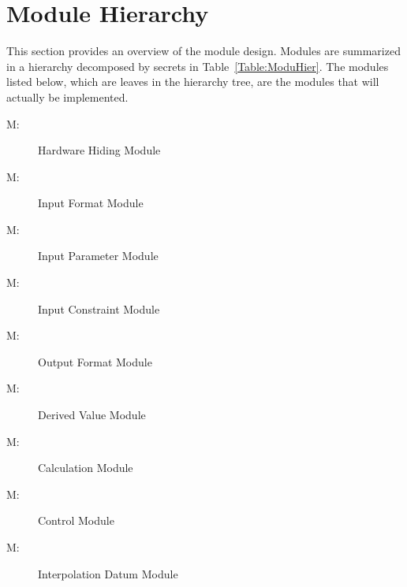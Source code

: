 \documentclass[12pt]{article}
\newcounter{modnum}
\newcommand{\mthemodnum}{M\themodnum}
\begin{document}
\section{Module Hierarchy}
\label{Sec:ModuHier}
This section provides an overview of the module design. Modules are summarized in a hierarchy decomposed by secrets in Table~\ref{Table:ModuHier}. The modules listed below, which are leaves in the hierarchy tree, are the modules that will actually be implemented.
\begin{description}
\item[\mthemodnum\label{M:hwHiding}:]Hardware Hiding Module
\end{description}
\begin{description}
\item[\mthemodnum\label{M:modInputFormat}:]Input Format Module
\end{description}
\begin{description}
\item[\mthemodnum\label{M:modInputParam}:]Input Parameter Module
\end{description}
\begin{description}
\item[\mthemodnum\label{M:modInputConstraint}:]Input Constraint Module
\end{description}
\begin{description}
\item[\mthemodnum\label{M:modoutputfdesc}:]Output Format Module
\end{description}
\begin{description}
\item[\mthemodnum\label{M:modDerivedVal}:]Derived Value Module
\end{description}
\begin{description}
\item[\mthemodnum\label{M:modcalcdesc}:]Calculation Module
\end{description}
\begin{description}
\item[\mthemodnum\label{M:modControl}:]Control Module
\end{description}
\begin{description}
\item[\mthemodnum\label{M:modInterpDatum}:]Interpolation Datum Module
\end{description}
\end{document}
